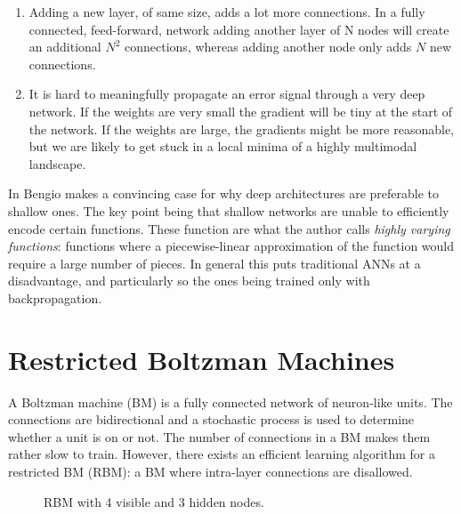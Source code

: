 \documentclass[11pt]{article}
\begin{document}
\begin{enumerate}
 \item Adding a new layer, of same size, adds a lot more connections.  In a fully connected, feed-forward, network adding another layer of N nodes will create an additional $N^2$ connections, whereas adding another node only adds $N$ new connections.
 \item It is hard to meaningfully propagate an error signal through a very deep network.  If the weights are very small the gradient will be tiny at the start of the network.  If the weights are large, the gradients might be more reasonable, but we are likely to get stuck in a local minima of a highly multimodal landscape.
\end{enumerate}

In \cite{bengio09} Bengio makes a convincing case for why deep architectures are preferable to shallow ones.  The key point being that shallow networks are unable to efficiently encode certain functions.  These function are what the author calls \textit{highly varying functions}: functions where a piecewise-linear approximation of the function would require a large number of pieces.  In general this puts traditional ANNs at a disadvantage, and particularly so the ones being trained only with backpropagation.

\section{Restricted Boltzman Machines}

A Boltzman machine (BM) is a fully connected network of neuron-like units.  The connections are bidirectional and a stochastic process is used to determine whether a unit is on or not.  The number of connections in a BM makes them rather slow to train.  However, there exists an efficient learning algorithm\cite{hinton06} for a restricted BM (RBM): a BM where intra-layer connections are disallowed.

\begin{figure}[htb]
  \centering
  \scalebox{0.5}
  {
  }
  \label{fig:rbm}
  \caption{RBM with 4 visible and 3 hidden nodes.}
\end{figure}
\end{document}
